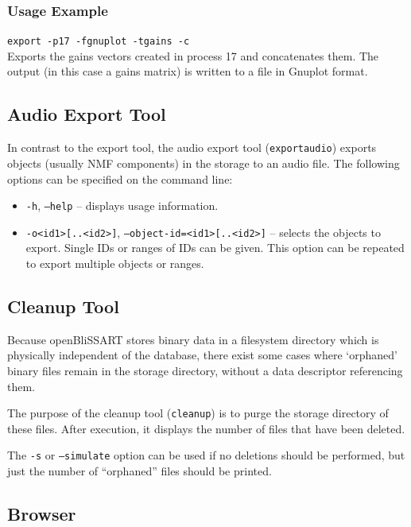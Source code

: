 \subsubsection{Usage Example}

{\tt export -p17 -fgnuplot -tgains -c}\\
Exports the gains vectors created in
process 17 and concatenates them. The output (in this case a gains matrix) 
is written to a file in Gnuplot format.


\subsection{Audio Export Tool}

In contrast to the export tool, the audio export tool ({\tt exportaudio})
exports objects (usually NMF components) in the storage to an audio file.
\noindent The following options can be specified on the command line:
\begin{itemize}
  \item {\tt -h}, {\tt --help} -- displays usage information.
  \item {\tt -o<id1>[..<id2>]}, {\tt --object-id=<id1>[..<id2>]}
    -- selects the objects to export. Single IDs or ranges of IDs can be given.
    This option can be repeated to export multiple objects or ranges.
\end{itemize}


\subsection{Cleanup Tool}

Because openBliSSART stores binary data in a filesystem directory which is
physically independent of the database, there exist some cases where
`orphaned' binary files remain in the storage directory, without a data
descriptor referencing them.

The purpose of the cleanup tool ({\tt cleanup}) is to purge the storage
directory of these files. After execution, it displays the number of files that
have been deleted.

The {\tt -s} or {\tt --simulate} option can be used if no deletions should
be performed, but just the number of ``orphaned'' files should be printed.


\subsection{Browser}
\label{section:browser}

